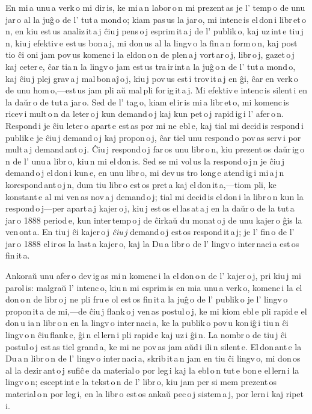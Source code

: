 \documentclass[ngerman,12pt,twoside]{book}
\begin{document}
En mi\,a unu\,a verk\,o mi dir\,is, ke mi\,a\,n labor\,o\,n mi prezent\,as je l' temp\,o de unu jar\,o al la juĝ\,o de l' tut\,a mond\,o; kiam pas\,us la jar\,o, mi intenc\,is el\,don\,i libr\,et\,o\,n, en kiu est\,us analiz\,it\,a\,j ĉiu\,j pens\,o\,j esprim\,it\,a\,j de l' publik\,o, kaj uz\,int\,e tiu\,j\,n, kiu\,j efektiv\,e est\,us bon\,a\,j, mi don\,us al la lingv\,o la fin\,a\,n form\,o\,n, kaj post tio ĉi oni jam pov\,us komenc\,i la eldon\,o\,n de plen\,a\,j vort\,ar\,o\,j, libr\,o\,j, gazet\,o\,j kaj ceter\,e, ĉar tia\,n la lingv\,o jam est\,us tra\,ir\,int\,a la juĝ\,o\,n de l' tut\,a mond\,o, kaj ĉiu\,j plej grav\,a\,j mal\,bon\,aĵ\,o\,j, kiu\,j pov\,us est\,i trov\,it\,a\,j en ĝi, ĉar en verk\,o de unu hom\,o,---est\,us jam pli aŭ mal\,pli for\,ig\,it\,a\,j. Mi efektiv\,e intenc\,is silent\,i en la daŭr\,o de tut\,a jar\,o. Sed de l' tag\,o, kiam el\,ir\,is mi\,a libr\,et\,o, mi komenc\,is ricev\,i mult\,o\,n da leter\,o\,j kun demand\,o\,j kaj kun pet\,o\,j rapid\,ig\,i l' afer\,o\,n. Respond\,i je ĉiu leter\,o apart\,e est\,as por mi ne ebl\,e, kaj tial mi decid\,is respond\,i publik\,e je ĉiu\,j demand\,o\,j kaj propon\,o\,j, ĉar tiel unu respond\,o pov\,as serv\,i por mult\,a\,j demand\,ant\,o\,j. Ĉiu\,j respond\,o\,j far\,os unu libr\,o\,n, kiu prezent\,os daŭr\,ig\,o\,n de l' unu\,a libr\,o, kiu\,n mi el\,don\,is. Sed se mi vol\,us la respond\,o\,j\,n je ĉiu\,j demand\,o\,j el\,don\,i kun\,e, en unu libr\,o, mi dev\,us tro long\,e atend\,ig\,i mi\,a\,j\,n korespond\,ant\,o\,j\,n, dum tiu libr\,o est\,os pret\,a kaj el\,don\,it\,a,---tiom pli, ke konstant\,e al mi ven\,as nov\,a\,j demand\,o\,j; tial mi decid\,is el\,don\,i la libr\,o\,n kun la respond\,o\,j---per apart\,a\,j kajer\,o\,j, kiu\,j est\,os el\,las\,at\,a\,j en la daŭr\,o de la tut\,a jar\,o 1888 period\,e, kun inter\,temp\,o\,j de ĉirkaŭ du monat\,o\,j de unu kajer\,o ĝis la ven\,ont\,a. En tiu\,j ĉi kajer\,o\,j \emph{ĉiu\,j} demand\,o\,j est\,os respond\,it\,a\,j; je l' fin\,o de l' jar\,o 1888 el\,ir\,os la last\,a kajer\,o, kaj la \glqq{}Du\,a libr\,o de l' lingv\,o inter\,naci\,a\grqq{} est\,os fin\,it\,a.

Ankoraŭ unu afer\,o dev\,ig\,as mi\,n komenc\,i la el\,don\,o\,n de l' kajer\,o\,j, pri kiu\,j mi parol\,is: malgraŭ l' intenc\,o, kiu\,n mi esprim\,is en mia unu\,a verk\,o, komenc\,i la el\,don\,o\,n de libr\,o\,j ne pli fru\,e ol est\,os fin\,it\,a la juĝ\,o de l' publik\,o je l' lingv\,o propon\,it\,a de mi,---de ĉiu\,j flank\,o\,j ven\,as postul\,o\,j, ke mi kiom ebl\,e pli rapid\,e el\,don\,u ia\,n libr\,o\,n en la lingv\,o inter\,naci\,a, ke la publik\,o pov\,u kon\,iĝ\,i tiu\,n ĉi lingv\,o\,n ĉiu\,flank\,e, ĝi\,n el\,lern\,i pli rapid\,e kaj uz\,i ĝi\,n. La nombr\,o de tiu\,j ĉi postul\,o\,j est\,as tiel grand\,a, ke mi ne pov\,as jam aŭd\,i ili\,n silent\,e. El\,don\,ant\,e la \glqq{}Du\,a\,n libr\,o\,n de l' lingv\,o inter\,naci\,a\grqq{}, skrib\,it\,a\,n jam en tiu ĉi lingv\,o, mi don\,os al la dezir\,ant\,o\,j sufiĉ\,e da material\,o por leg\,i kaj la ebl\,o\,n tut\,e bon\,e el\,lern\,i la lingv\,o\,n; escept\,int\,e la tekst\,o\,n de l' libr\,o, kiu jam per si mem prezent\,os material\,o\,n por leg\,i, en la libr\,o est\,os ankaŭ pec\,o\,j sistem\,a\,j, por lern\,i kaj ripet\,i.
\end{document}
